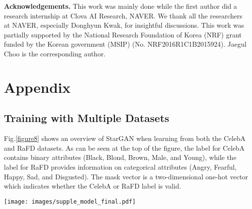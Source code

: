\documentclass[10pt,twocolumn,letterpaper]{article}
\begin{document}
\vspace{7px}

\noindent\textbf{Acknowledgements.} This work was mainly done while the first author did a research internship at Clova AI Research, NAVER. We thank all the researchers at NAVER, especially Donghyun Kwak, for insightful discussions. This work was partially supported by the National Research Foundation of Korea
(NRF) grant funded by the Korean government (MSIP) (No. NRF2016R1C1B2015924). Jaegul Choo is the corresponding author.


{\small


}
\vspace{10in}
\onecolumn
\section{Appendix} \label{appendix}
\subsection{Training with Multiple Datasets} 
Fig.\thinspace\ref{figure8} shows an overview of StarGAN when learning from both the CelebA and RaFD datasets. As can be seen at the top of the figure, the label for CelebA contains binary attributes (Black, Blond, Brown, Male, and Young), while the label for RaFD provides information on categorical attributes (Angry, Fearful, Happy, Sad, and Disgusted). The mask vector is a two-dimensional one-hot vector which indicates whether the CelebA or RaFD label is valid.


\begin{figure*}[h]
\centering
\centerline{\texttt{[image: images/supple\_model\_final.pdf]}}
\medskip
\caption{Overview of StarGAN when training with both CelebA and RaFD. \textbf{(a)  (d)} shows the training process using CelebA, and \textbf{(e)  (h)} shows the training process using RaFD. \textbf{(a), (e)} The discriminator  learns to distinguish between real and fake images and minimize the classification error only for the known label. \textbf{(b), (c), (f), (g)} When the mask vector (purple) is [1, 0], the generator  learns to focus on the CelebA label (yellow) and ignore the RaFD label (green) to perform image-to-image translation, and vice versa when the mask vector is [0, 1]. \textbf{(d), (h)}  tries to generate images that are both indistinguishable from real images and classifiable by  as belonging to the target domain.}
\label{figure8}
\end{figure*}
\end{document}
